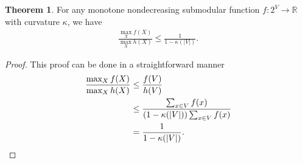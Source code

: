 \documentclass[letterpaper]{article}
\theoremstyle{definition}
\newtheorem{theorem}{Theorem}
\begin{document}
\begin{theorem}
\label{thm:worsebutcurvature}
For any monotone nondecreasing submodular function $f:2^V\to\mathbb{R}$ with curvature $\kappa$,
we have %
\begin{align}
\frac{\max_{X} f(X)}{\max_{X} h(X)}\le \frac{1}{1-\kappa(|V|)}.
\end{align}
\end{theorem}
\begin{proof}
This proof can be done in a straightforward manner
\begin{align}
  \frac{\max_{X} f(X)}{\max_{X} h(X)}
  &\le \frac{f(V)}{h(V)}\notag\\
  &\le \frac{\sum_{x\in V}f(x)}{(1-\kappa(|V|))\sum_{x\in V}f(x)}\notag\\
  &= \frac{1}{1-\kappa(|V|)}.
\end{align}
\end{proof}


\end{document}
